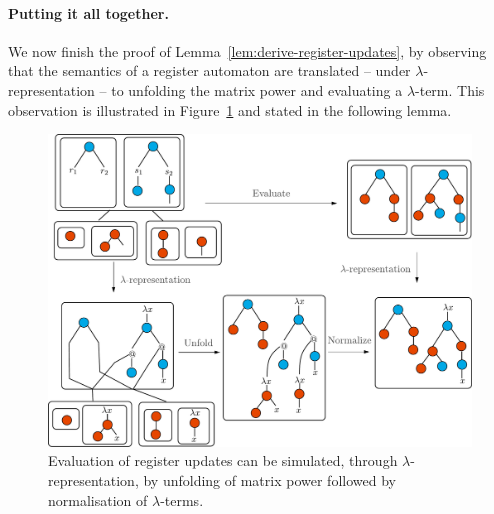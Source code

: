 \label{page:monotone-discussed}


\paragraph*{Putting it all together.}
We now finish the proof of Lemma~\ref{lem:derive-register-updates}, by  observing  that the semantics of a register automaton are translated -- under $\lambda$-representation -- to unfolding the matrix power and evaluating a $\lambda$-term.  This observation is illustrated in Figure~\ref{fig:register-lambda} and stated in the following lemma.
\begin{figure}[]
    \centering
\includegraphics[scale=.3]{pictures/lambda-rep-diagram}   
    \caption{Evaluation of register updates can be simulated, through $\lambda$-representation, by unfolding of matrix power followed by normalisation of $\lambda$-terms.}
    \label{fig:register-lambda}
\end{figure}


